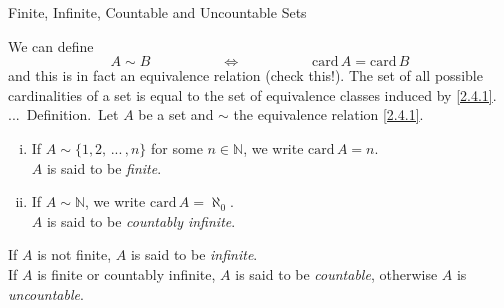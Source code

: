 \documentclass[smaller,hyperref={CJKbookmarks=true}]{beamer}
\newcommand{\N}{\mathbb{N}} \newcommand{\Z}{\mathbb{Z}} \newcommand{\Q}{\mathbb{Q}}
\newcounter{zhuo}[subsection]
\renewcommand{\thezhuo}{\thesection.\thesubsection.\arabic{zhuo}}
\newenvironment{DEFINITION}{\stepcounter{zhuo}\alert{\thezhuo.~Definition.\,}}{}
\begin{document}
\begin{frame}[t]{Finite, Infinite, Countable and Uncountable Sets}
\begin{spacing}{1.05}
We can define
\setcounter{equation}{0}
\begin{equation}\label{2.4.1}
A\sim B\qquad\qquad\quad\Leftrightarrow\qquad
\qquad\quad\text{card}\,A=\text{card}\,B
\end{equation}
and this is in fact an equivalence relation (check this!). The set of all
possible cardinalities of a set is equal to the set of equivalence classes
induced by \eqref{2.4.1}.\\[5pt]
\begin{DEFINITION}
Let $A$ be a set and $\sim$ the equivalence relation \eqref{2.4.1}.
\begin{enumerate}[(i)]
  \item If $A\sim\{1,2,\,...\,,n\}$ for some $n\in\N$, we write $\text{card}\,A=n$.\\ $A$ is said to be \emph{finite}.
  \item If $A\sim\N$, we write $\text{card}\,A=\aleph_0$.\\ $A$ is said to be \emph{countably infinite}.
\end{enumerate}
If $A$ is not finite, $A$ is said to be \emph{infinite}.\\[5pt]
If $A$ is finite or countably infinite, $A$ is said to be \emph{countable}, otherwise $A$ is \emph{uncountable}.
\end{DEFINITION}
\end{spacing}
\end{frame}
\end{document}
